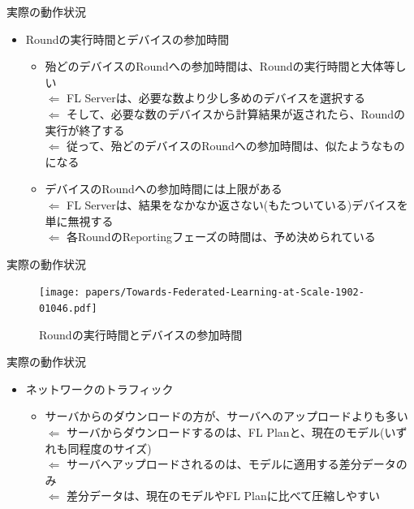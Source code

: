 \documentclass[dvipdfmx,notheorems,t]{beamer}
\begin{document}
\begin{frame}{実際の動作状況}

\begin{itemize}
	\item Roundの実行時間とデバイスの参加時間
	\begin{itemize}
		\item 殆どのデバイスのRoundへの参加時間は、Roundの実行時間と大体等しい \\
		$\Leftarrow$ FL Serverは、必要な数より少し多めのデバイスを選択する \\
		$\Leftarrow$ そして、必要な数のデバイスから計算結果が返されたら、Roundの実行が終了する \\
		$\Leftarrow$ 従って、殆どのデバイスのRoundへの参加時間は、似たようなものになる
		\newline
		
		\item デバイスのRoundへの参加時間には上限がある \\
		$\Leftarrow$ FL Serverは、結果をなかなか返さない(もたついている)デバイスを単に無視する \\
		$\Leftarrow$ 各RoundのReportingフェーズの時間は、予め決められている
	\end{itemize}
\end{itemize}

\end{frame}

\begin{frame}{実際の動作状況}

\begin{figure}
	\centering
	\texttt{[image: papers/Towards-Federated-Learning-at-Scale-1902-01046.pdf]}
	\caption{Roundの実行時間とデバイスの参加時間~\cite{DBLP:journals/corr/abs-1902-01046}}
	\label{fig:round-execution-time}
\end{figure}

\end{frame}

\begin{frame}{実際の動作状況}

\begin{itemize}
	\item ネットワークのトラフィック
	\begin{itemize}
		\item サーバからのダウンロードの方が、サーバへのアップロードよりも多い \\
		$\Leftarrow$ サーバからダウンロードするのは、FL Planと、現在のモデル(いずれも同程度のサイズ) \\
		$\Leftarrow$ サーバへアップロードされるのは、モデルに適用する差分データのみ \\
		$\Leftarrow$ 差分データは、現在のモデルやFL Planに比べて圧縮しやすい
	\end{itemize}
\end{itemize}

\end{frame}
\end{document}
